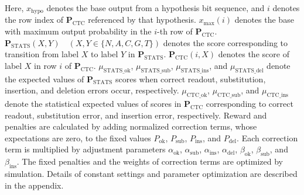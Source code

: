 \documentclass[sotsuron]{kuee}
\begin{document}
Here, $x_{\mathrm{hypo}}$ denotes the base output from a hypothesis bit
sequence, and $i$ denotes the row index of $\bm{P}_{\mathrm{CTC}}$ referenced
by that hypothesis.
$x_{\mathrm{max}}(i)$ denotes the base with maximum output probability in the
$i$-th row of $\bm{P}_{\mathrm{CTC}}$.
$\bm{P}_{\mathrm{STATS}}(X,Y)\quad(X,Y\in \{N,A,C,G,T\})$ denotes the score
corresponding to transition from label $X$ to label $Y$ in
$\bm{P}_{\mathrm{STATS}}$.
$\bm{P}_{\mathrm{CTC}}(i,X)$ denotes the score of label $X$ in row $i$ of
$\bm{P}_{\mathrm{CTC}}$.
$\mu_{\mathrm{STATS}\_\mathrm{ok}}$,
$\mu_{\mathrm{STATS}\_\mathrm{sub}}$,
$\mu_{\mathrm{STATS}\_\mathrm{ins}}$,
and $\mu_{\mathrm{STATS}\_\mathrm{del}}$ denote the expected values of
$\bm{P}_{\mathrm{STATS}}$ scores when correct readout, substitution,
insertion, and deletion errors occur, respectively.
$\mu_{\mathrm{CTC}\_\mathrm{ok}}$,
$\mu_{\mathrm{CTC}\_\mathrm{sub}}$,
and $\mu_{\mathrm{CTC}\_\mathrm{ins}}$ denote the statistical expected values
of scores in $\bm{P}_{\mathrm{CTC}}$ corresponding to correct readout,
substitution error, and insertion error, respectively.
Reward and penalties are calculated by adding normalized correction terms,
whose expectations are zero, to the fixed values
$P_{\mathrm{ok}}$, $P_{\mathrm{sub}}$, $P_{\mathrm{ins}}$, and
$P_{\mathrm{del}}$.
Each correction term is multiplied by adjustment parameters
$\alpha_{\mathrm{ok}}$, $\alpha_{\mathrm{sub}}$, $\alpha_{\mathrm{ins}}$,
$\alpha_{\mathrm{del}}$, $\beta_{\mathrm{ok}}$, $\beta_{\mathrm{sub}}$, and
$\beta_{\mathrm{ins}}$.
The fixed penalties and the weights of correction terms are optimized by
simulation. Details of constant settings and parameter optimization are
described in the appendix.
\end{document}
